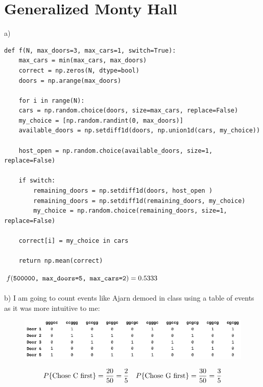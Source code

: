 \documentclass{article}
\begin{document}
\pagebreak

\section{Generalized Monty Hall}
a)
\begin{lstlisting}
def f(N, max_doors=3, max_cars=1, switch=True):
	max_cars = min(max_cars, max_doors)
	correct = np.zeros(N, dtype=bool)
	doors = np.arange(max_doors)
	
	for i in range(N):
	cars = np.random.choice(doors, size=max_cars, replace=False)
	my_choice = [np.random.randint(0, max_doors)]
	available_doors = np.setdiff1d(doors, np.union1d(cars, my_choice))
	
	host_open = np.random.choice(available_doors, size=1, replace=False)
	
	if switch:
		remaining_doors = np.setdiff1d(doors, host_open )
		remaining_doors = np.setdiff1d(remaining_doors, my_choice)
		my_choice = np.random.choice(remaining_doors, size=1, replace=False)
	
	correct[i] = my_choice in cars
	
	return np.mean(correct)
\end{lstlisting}
\vspace{10pt}
\noindent
$f(\texttt{500000, max\_doors=5, max\_cars=2})\\=0.5333$
\\
\\
\noindent
b)
I am going to count events like Ajarn demoed in class using a table of events as it was more intuitive to me:

\begin{figure}[H]
	\centering
	\includegraphics[width=1\linewidth]{../drawings/p3_1}
\end{figure}

\vspace{-20pt}
\begin{align*}
	P\{\text{Chose C first}\} = \frac{20}{50} = \frac{2}{5} \text{\hspace{10pt}}
	P\{\text{Chose G first}\} = \frac{30}{50} = \frac{3}{5} 
\end{align*}
\end{document}
